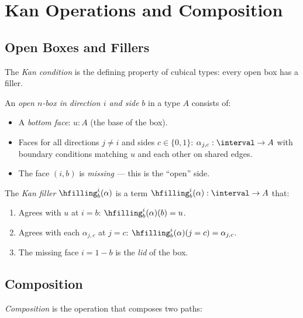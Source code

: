 
\chapter{Kan Operations and Composition}
\label{ch:kan}

\section{Open Boxes and Fillers}

The \emph{Kan condition} is the defining property of cubical types:
every open box has a filler.

\begin{definition}
An \emph{open $n$-box in direction $i$ and side $b$} in a type $A$
consists of:
\begin{itemize}
  \item A \emph{bottom face}: $u : A$ (the base of the box).
  \item Faces for all directions $j \neq i$ and sides $c \in \{0,1\}$:
    $\alpha_{j,c} : \interval \to A$ with boundary conditions matching
    $u$ and each other on shared edges.
  \item The face $(i, b)$ is \emph{missing} --- this is the ``open''
    side.
\end{itemize}
\end{definition}

\begin{definition}
The \emph{Kan filler} $\hfilling^i_b(\alpha)$ is a term
$\hfilling^i_b(\alpha) : \interval \to A$ that:
\begin{enumerate}
  \item Agrees with $u$ at $i = b$:
    $\hfilling^i_b(\alpha)(b) = u$.
  \item Agrees with each $\alpha_{j,c}$ at $j = c$:
    $\hfilling^i_b(\alpha)(j = c) = \alpha_{j,c}$.
  \item The missing face $i = 1-b$ is the \emph{lid} of the box.
\end{enumerate}
\end{definition}

\section{Composition}

\emph{Composition} is the operation that composes two paths:

